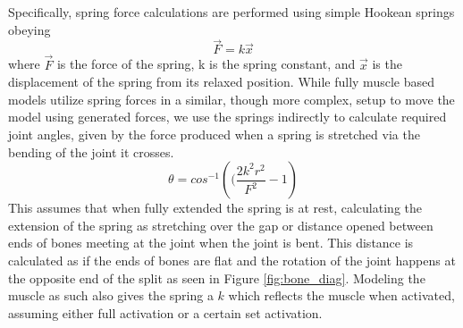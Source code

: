 \documentclass[landscape,26pt]{sciposter}
\begin{document}
\begin{minipage}[t]{17in}
        Specifically, spring force calculations are performed using simple Hookean springs obeying \[ \vec{F} = k\vec{x} \] where $\vec{F}$ is the force of the spring, k is the spring constant, and $\vec{x}$ is the displacement of the spring from its relaxed position.  While fully muscle based models utilize spring forces in a similar, though more complex, setup to move the model using generated forces, we use the springs indirectly to calculate required joint angles, given by the force produced when a spring is stretched via the bending of the joint it crosses. \[\theta = cos^{-1} \left( ( \dfrac{2 k^2 r^2}{F^2} - 1 \right)\] This assumes that when fully extended the spring is at rest, calculating the extension of the spring as stretching over the gap or distance opened between ends of bones meeting at the joint when the joint is bent.  This distance is calculated as if the ends of bones are flat and the rotation of the joint happens at the opposite end of the split as seen in Figure \ref{fig:bone_diag}.  Modeling the muscle as such also gives the spring a $k$ which reflects the muscle when activated, assuming either full activation or a certain set activation.

\end{minipage}
%
\hfill
\end{document}
